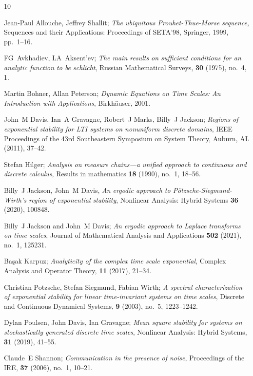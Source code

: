 \documentclass[reqno]{amsart}
\begin{document}
\begin{thebibliography}{10}

Jean-Paul Allouche, Jeffrey Shallit;
 \emph{The ubiquitous
  {P}rouhet-{T}hue-{M}orse sequence}, Sequences and their Applications:
  Proceedings of SETA’98, Springer, 1999, pp.~1--16.

FG~Avkhadiev, LA~Aksent'ev;
 \emph{The main results on sufficient conditions
  for an analytic function to be schlicht}, Russian Mathematical Surveys,
  \textbf{30} (1975), no.~4, 1.

Martin Bohner, Allan Peterson;
\emph{Dynamic {E}quations on {T}ime {S}cales:
  {A}n {I}ntroduction with {A}pplications}, Birkh\"auser, 2001.

John~M Davis, Ian~A Gravagne, Robert~J Marks, Billy~J Jackson;
  \emph{Regions of exponential stability for {LTI} systems on nonuniform
  discrete domains}, IEEE Proceedings of the 43rd Southeastern Symposium on
  System Theory, Auburn, AL (2011), 37--42.

Stefan Hilger;
\emph{Analysis on measure chains---a unified approach to
  continuous and discrete calculus}, Results in mathematics \textbf{18} (1990),
  no.~1, 18--56.

Billy~J Jackson, John~M Davis, \emph{An ergodic approach to
  {P}\"otzsche-{S}iegmund-{W}irth's region of exponential stability}, Nonlinear
  Analysis: Hybrid Systems \textbf{36} (2020), 100848.

Billy~J {J}ackson and John~M {D}avis;
\emph{An ergodic approach to {L}aplace
  transforms on time scales}, Journal of Mathematical Analysis and Applications
  \textbf{502} (2021), no.~1, 125231.

Ba{\c{s}}ak Karpuz;
 \emph{Analyticity of the complex time scale exponential},
  Complex Analysis and Operator Theory, \textbf{11} (2017), 21--34.

Christian Potzsche, Stefan Siegmund, Fabian Wirth;
\emph{A spectral
  characterization of exponential stability for linear time-invariant systems
  on time scales}, Discrete and Continuous Dynamical Systems, \textbf{9} (2003),
  no.~5, 1223--1242.

Dylan Poulsen, John Davis, Ian Gravagne;
\emph{Mean square stability for
  systems on stochastically generated discrete time scales}, Nonlinear
  Analysis: Hybrid Systems, \textbf{31} (2019), 41--55.

Claude~E Shannon;
 \emph{Communication in the presence of noise}, Proceedings of
  the IRE, \textbf{37} (2006), no.~1, 10--21.

\end{thebibliography}
\end{document}
